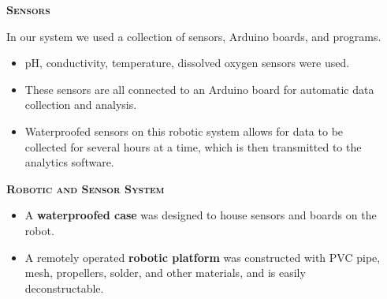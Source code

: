 \documentclass[final,t]{beamer}
\begin{document}
\begin{frame}{}
\begin{columns}
\begin{column}{.33\linewidth}
            \end{column}
            \begin{column}{.33\linewidth}
                \begin{block}{\textsc{\textbf{Sensors}}}
                    \vspace*{3mm}

                   In our system we used a collection of sensors, Arduino boards, and programs.
                    \begin{itemize}
                    	\item pH, conductivity, temperature, dissolved oxygen sensors
                      were used.
                    	\item These sensors are all connected to an Arduino board
                      for automatic data collection and analysis.
                     	\item Waterproofed sensors on this robotic system allows for
                      data to be collected for several hours at a time, which is
                      then transmitted to the analytics software.
                     \end{itemize}

                    \vspace*{3mm}
                \end{block}
  				\begin{block}{\textsc{\textbf{Robotic and Sensor System}}}
                    \begin{itemize}
                    			\item A \textbf{waterproofed case} was designed to house sensors and boards on the robot.
							\item A remotely operated \textbf{robotic platform} was constructed with PVC pipe,
                      mesh, propellers, solder, and other materials, and is easily
                      deconstructable.
				 \end{itemize}
				

\end{block}
\end{column}
\end{columns}
\end{frame}
\end{document}
